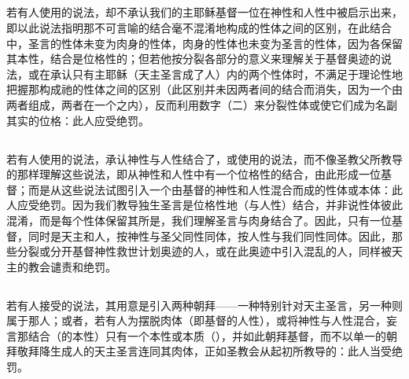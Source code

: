 
\subsection{}

若有人使用的说法，却不承认我们的主耶稣基督一位在神性和人性中被启示出来，即以此说法指明那不可言喻的结合毫不混淆地构成的性体之间的区别，在此结合中，圣言的性体未变为肉身的性体，肉身的性体也未变为圣言的性体，因为各保留其本性，结合是位格性的；但若他按分裂各部分的意义来理解关于基督奥迹的说法，或在承认只有主耶稣（天主圣言成了人）内的两个性体时，不满足于理论性地把握那构成祂的性体之间的区别（此区别并未因两者间的结合而消失，因为一个由两者组成，两者在一个之内），反而利用数字（二）来分裂性体或使它们成为名副其实的位格：此人应受绝罚。\par


\subsection{}

若有人使用的说法，承认神性与人性结合了，或使用的说法，而不像圣教父所教导的那样理解这些说法，即从神性和人性中有一个位格性的结合，由此形成一位基督；而是从这些说法试图引入一个由基督的神性和人性混合而成的性体或本体：此人应受绝罚。因为我们教导独生圣言是位格性地（与人性）结合，并非说性体彼此混淆，而是每个性体保留其所是，我们理解圣言与肉身结合了。因此，只有一位基督，同时是天主和人，按神性与圣父同性同体，按人性与我们同性同体。因此，那些分裂或分开基督神性救世计划奥迹的人，或在此奥迹中引入混乱的人，同样被天主的教会谴责和绝罚。\par


\subsection{}

若有人接受的说法，其用意是引入两种朝拜——一种特别针对天主圣言，另一种则属于那人；或者，若有人为摆脱肉体（即基督的人性），或将神性与人性混合，妄言那结合（的本性）只有一个本性或本质（），并如此朝拜基督，而不以单一的朝拜敬拜降生成人的天主圣言连同其肉体，正如圣教会从起初所教导的：此人当受绝罚。\par

